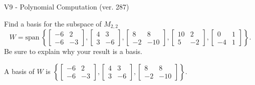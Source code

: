 \begin{exercise}
  \begin{exerciseTitle}V9 - Polynomial Computation (ver. 287)\end{exerciseTitle}
  \begin{exerciseStatement}
    Find a basis for the subspace of \(M_{2,2}\) 
\[W=\mathrm{span}\ \left\{\left[\begin{array}{cc}
-6 & 2 \\
-6 & -3
\end{array}\right] , \left[\begin{array}{cc}
4 & 3 \\
3 & -6
\end{array}\right] , \left[\begin{array}{cc}
8 & 8 \\
-2 & -10
\end{array}\right] , \left[\begin{array}{cc}
10 & 2 \\
5 & -2
\end{array}\right] , \left[\begin{array}{cc}
0 & 1 \\
-4 & 1
\end{array}\right]\right\}.\]
 Be sure to explain why your result is a basis.


  \end{exerciseStatement}
  \begin{exerciseAnswer}
   A basis of \(W\) is  \(\left\{\left[\begin{array}{cc}
-6 & 2 \\
-6 & -3
\end{array}\right] , \left[\begin{array}{cc}
4 & 3 \\
3 & -6
\end{array}\right] , \left[\begin{array}{cc}
8 & 8 \\
-2 & -10
\end{array}\right]\right\}\).
  


  \end{exerciseAnswer}
\end{exercise}